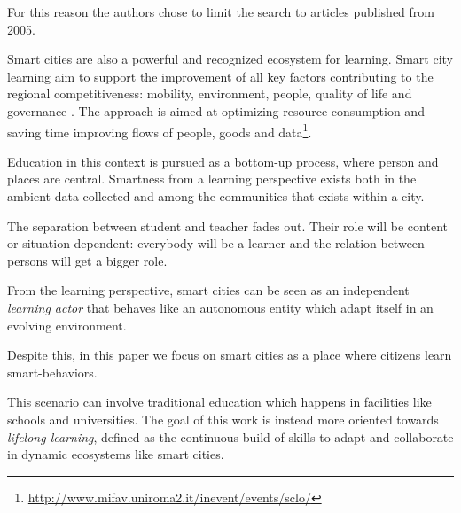 For this reason the authors chose to limit the search to articles published from 2005.

Smart cities are also a powerful and recognized ecosystem for learning. Smart city learning aim to support the improvement of all key factors contributing to the regional competitiveness: mobility, environment, people, quality of life and governance \cite{hollands_will_2008}. The approach is aimed at optimizing resource consumption and saving time improving flows of people, goods and data\footnote{\url{http://www.mifav.uniroma2.it/inevent/events/sclo/}}.

Education in this context is pursued as a bottom-up process, where person and places are central. Smartness from a learning perspective exists both in the ambient data collected and among the communities that exists within a city.

The separation between student and teacher fades out. Their role will be content or situation dependent: everybody will be a learner and the relation between persons will get a bigger role.

From the learning perspective, smart cities can be seen as an independent \textit{learning actor} that behaves like an autonomous entity which adapt itself in an evolving environment.

Despite this, in this paper we focus on smart cities as a place where citizens learn smart-behaviors.

This scenario can involve traditional education which happens in facilities like schools and universities. The goal of this work is instead more oriented towards \textit{lifelong learning}, defined as the continuous build of skills to adapt and collaborate in dynamic ecosystems like smart cities.